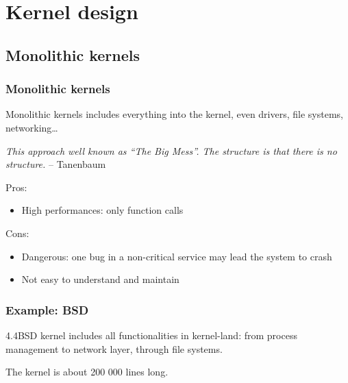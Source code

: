 %
%

\section{Kernel design}
\subsection{Monolithic kernels}

%
%

\begin{frame}
  \frametitle{Monolithic kernels}

  Monolithic kernels includes everything into the kernel, even drivers, file systems, networking\ldots

  \-

  \emph{This approach well known as ``The Big Mess''. The structure is that there is no structure.} -- Tanenbaum

  \-

  Pros:

  \begin{itemize}
  \item
    High performances: only function calls
  \end{itemize}

  \-

  Cons:

  \begin{itemize}
  \item
    Dangerous: one bug in a non-critical service may lead the system
    to crash
  \item
    Not easy to understand and maintain
  \end{itemize}

\end{frame}

%
%

\begin{frame}
  \frametitle{Example: BSD}

  4.4BSD kernel includes all functionalities in kernel-land: from process management to network layer, through file systems.

  \begin{center}
  \end{center}

  The kernel is about 200 000 lines long.

\end{frame} 

